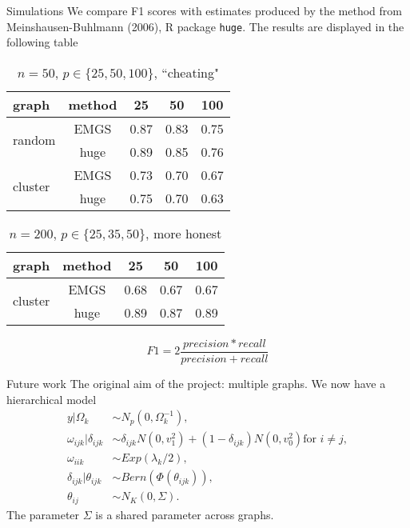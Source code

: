 \documentclass{beamer}
\begin{document}
\begin{frame}{Simulations}
	We compare F1 scores with estimates produced by the method from
	Meinshausen-Buhlmann (2006), R package \texttt{huge}. The results are
	displayed in the following table
	\begin{table}
		\centering
		\small
		\caption{$n=50$, $p \in \{25, 50, 100\}$, ``cheating"}
		\begin{tabular}{|l||c|c|c|c|}
			\hline
			graph                    & method & 25   & 50   & 100  \\
			\hline
			\multirow{2}{*}{random}  & EMGS   & 0.87 & 0.83 & 0.75 \\
			                         & huge   & 0.89 & 0.85 & 0.76 \\
			\hline
			\multirow{2}{*}{cluster} & EMGS   & 0.73 & 0.70 & 0.67 \\
			                         & huge   & 0.75 & 0.70 & 0.63 \\
			\hline
		\end{tabular}
	\end{table}
	\begin{table}
		\centering
		\small
		\caption{$n=200$, $p \in \{25, 35, 50\}$, more honest}
		\begin{tabular}{|l||c|c|c|c|}
			\hline
			graph                    & method & 25   & 50   & 100  \\
			\hline
			\multirow{2}{*}{cluster} & EMGS   & 0.68 & 0.67 & 0.67 \\
			                         & huge   & 0.89 & 0.87 & 0.89 \\
			\hline
		\end{tabular}
	\end{table}
	\[F1 = 2 \frac{precision \ast recall}{precision+recall}\]
\end{frame}
\begin{frame}{Future work}
	The original aim of the project: multiple graphs.
	We now have a hierarchical model
	\begin{align*}
		y | \Omega_k                & \sim N_p(0, \Omega_k^{-1}),                                                          \\
		\omega_{ijk} | \delta_{ijk} & \sim \delta_{ijk} N(0, v_1^2) + (1 - \delta_{ijk}) N(0, v_0^2) \text{for } i \neq j, \\
		\omega_{iik}                & \sim Exp(\lambda_k/2),                                                               \\
		\delta_{ijk} | \theta_{ijk} & \sim Bern(\Phi(\theta_{ijk})),                                                       \\
		\theta_{ij}                 & \sim N_K(0, \Sigma).
	\end{align*}
	The parameter $\Sigma$ is a shared parameter across graphs.
\end{frame}
\end{document}
